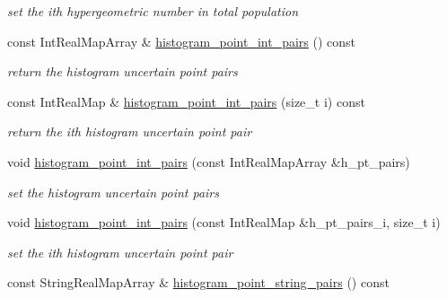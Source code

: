 \begin{DoxyCompactItemize}
\begin{DoxyCompactList}\small\item\em set the ith hypergeometric number in total population \end{DoxyCompactList}\item 
const Int\+Real\+Map\+Array \& \hyperlink{classPecos_1_1AleatoryDistParams_a38769d8e9e9e2a570aa0360103e46afc}{histogram\+\_\+point\+\_\+int\+\_\+pairs} () const \label{classPecos_1_1AleatoryDistParams_a38769d8e9e9e2a570aa0360103e46afc}

\begin{DoxyCompactList}\small\item\em return the histogram uncertain point pairs \end{DoxyCompactList}\item 
const Int\+Real\+Map \& \hyperlink{classPecos_1_1AleatoryDistParams_ae4d5e50b1f9523589a76447325c6d6bc}{histogram\+\_\+point\+\_\+int\+\_\+pairs} (size\+\_\+t i) const \label{classPecos_1_1AleatoryDistParams_ae4d5e50b1f9523589a76447325c6d6bc}

\begin{DoxyCompactList}\small\item\em return the ith histogram uncertain point pair \end{DoxyCompactList}\item 
void \hyperlink{classPecos_1_1AleatoryDistParams_af41d5a3fc32eb3968f04f8161e3199d2}{histogram\+\_\+point\+\_\+int\+\_\+pairs} (const Int\+Real\+Map\+Array \&h\+\_\+pt\+\_\+pairs)\label{classPecos_1_1AleatoryDistParams_af41d5a3fc32eb3968f04f8161e3199d2}

\begin{DoxyCompactList}\small\item\em set the histogram uncertain point pairs \end{DoxyCompactList}\item 
void \hyperlink{classPecos_1_1AleatoryDistParams_a85a48334c2e582fd78f75867daa93428}{histogram\+\_\+point\+\_\+int\+\_\+pairs} (const Int\+Real\+Map \&h\+\_\+pt\+\_\+pairs\+\_\+i, size\+\_\+t i)\label{classPecos_1_1AleatoryDistParams_a85a48334c2e582fd78f75867daa93428}

\begin{DoxyCompactList}\small\item\em set the ith histogram uncertain point pair \end{DoxyCompactList}\item 
const String\+Real\+Map\+Array \& \hyperlink{classPecos_1_1AleatoryDistParams_ac4a63c7136754f1d44b4105f52d7e125}{histogram\+\_\+point\+\_\+string\+\_\+pairs} () const \label{classPecos_1_1AleatoryDistParams_ac4a63c7136754f1d44b4105f52d7e125}


\end{DoxyCompactItemize}
